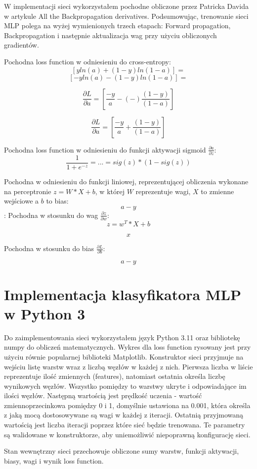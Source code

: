 \documentclass[12pt]{article}
\begin{document}
W implementacji sieci wykorzystałem pochodne obliczone przez Patricka Davida w artykule All the Backpropagation derivatives. Podsumowując, trenowanie sieci MLP polega na wyżej wymienionych trzech etapach: Forward propagation, Backpropagation i następnie aktualizacja wag przy użyciu obliczonych gradientów.

Pochodna loss function w odniesieniu do cross-entropy:
$$[yln(a) + (1-y)ln(1-a)] = $$
$$[-yln(a) - (1-y)ln(1-a)] = $$

$$\frac{\partial L}{\partial a} = [\frac{-y}{a} - (-)\frac{(1-y)}{(1-a)}]$$

$$\frac{\partial L}{\partial a} = [\frac{-y}{a} + \frac{(1-y)}{(1-a)}]$$

Pochodna loss function w odniesieniu do funkcji aktywacji sigmoid $\frac{\partial a}{\partial z}$:
$$\frac{1}{1+e^{-z}} = ... = sig(z) * (1 - sig (z))$$

Pochodna w odniesieniu do funkcji liniowej, reprezentującej obliczenia wykonane na perceptronie $z = W*X + b$, w której $W$ reprezentuje wagi, $X$ to zmienne wejściowe a $b$ to bias:
$$a - y$$
:
Pochodna w stosunku do wag $\frac{\partial z}{\partial w}$:
$$z = w^T*X + b$$

$$x$$

Pochodna w stosunku do bias $\frac{\partial L}{\partial b}$:

$$a - y$$

\section{Implementacja klasyfikatora MLP w Python 3}

Do zaimplementowania sieci wykorzystałem język Python 3.11 oraz bibliotekę numpy do obliczeń matematycznych. Wykres dla loss function rysowany jest przy użyciu równie popularnej biblioteki Matplotlib.
Konstruktor sieci przyjmuje na wejściu listę warstw wraz z liczbą węzłów w każdej z nich. Pierwsza liczba w liście reprezentuje ilość zmiennych (features), natomiast ostatnia określa liczbę wynikowych węzłów. Wszystko pomiędzy to warstwy ukryte i odpowiadające im ilości węzłów. Następną wartością jest prędkość uczenia - wartość zmiennoprzecinkowa pomiędzy 0 i 1, domyślnie ustawiona na 0.001, która określa z jaką mocą dostosowywane są wagi w każdej z iteracji. Ostatnią przyjmowaną wartością jest liczba iteracji poprzez które sieć będzie trenowana. Te parametry są walidowane w konstruktorze, aby uniemożliwić niepoprawną konfigurację sieci.

Stan wewnętrzny sieci przechowuje obliczone sumy warstw, funkcji aktywacji, biasy, wagi i wynik loss function.
\end{document}
